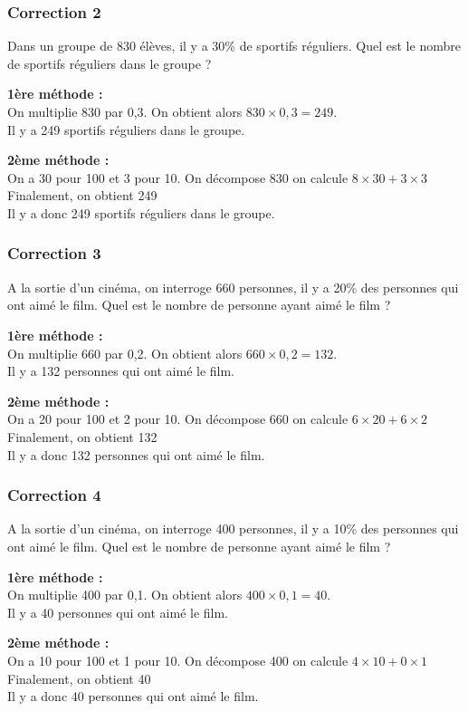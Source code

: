 \documentclass[15pt, mathserif]{beamer}
\begin{document}
\begin{frame}
\vspace{-10mm}
	\frametitle{Correction 2}
Dans un groupe de 830 élèves, il y a 30\% de sportifs réguliers. Quel est le nombre de sportifs réguliers dans le groupe ? \begin{multicols}{2} \textbf{1ère méthode : \\} On multiplie 830 par 0,3. On obtient alors $830 \times 0,3=249$. \\ Il y a 249 sportifs réguliers dans le groupe. 
 \columnbreak 
 
 \textbf{2ème méthode :} \\ On a 30 pour 100 et 3 pour 10. On décompose 830 on calcule $8\times30+3\times3$ \\ Finalement, on obtient 249\\ Il y a donc 249 sportifs réguliers dans le groupe. \end{multicols}\end{frame}


\begin{frame}
\vspace{-10mm}
	\frametitle{Correction 3}
A la sortie d'un cinéma, on interroge 660 personnes, il y a 20\% des personnes qui ont aimé le film. Quel est le nombre de personne ayant aimé le film ? \begin{multicols}{2} \textbf{1ère méthode : \\} On multiplie 660 par 0,2. On obtient alors $660 \times 0,2=132$. \\ Il y a 132 personnes qui ont aimé le film. 
 \columnbreak 
 
 \textbf{2ème méthode :} \\ On a 20 pour 100 et 2 pour 10. On décompose 660 on calcule $6\times20+6\times2$ \\ Finalement, on obtient 132\\ Il y a donc 132 personnes qui ont aimé le film. \end{multicols}\end{frame}


\begin{frame}
\vspace{-10mm}
	\frametitle{Correction 4}
A la sortie d'un cinéma, on interroge 400 personnes, il y a 10\% des personnes qui ont aimé le film. Quel est le nombre de personne ayant aimé le film ? \begin{multicols}{2} \textbf{1ère méthode : \\} On multiplie 400 par 0,1. On obtient alors $400 \times 0,1=40$. \\ Il y a 40 personnes qui ont aimé le film. 
 \columnbreak 
 
 \textbf{2ème méthode :} \\ On a 10 pour 100 et 1 pour 10. On décompose 400 on calcule $4\times10+0\times1$ \\ Finalement, on obtient 40\\ Il y a donc 40 personnes qui ont aimé le film. \end{multicols}\end{frame}
\end{document}
